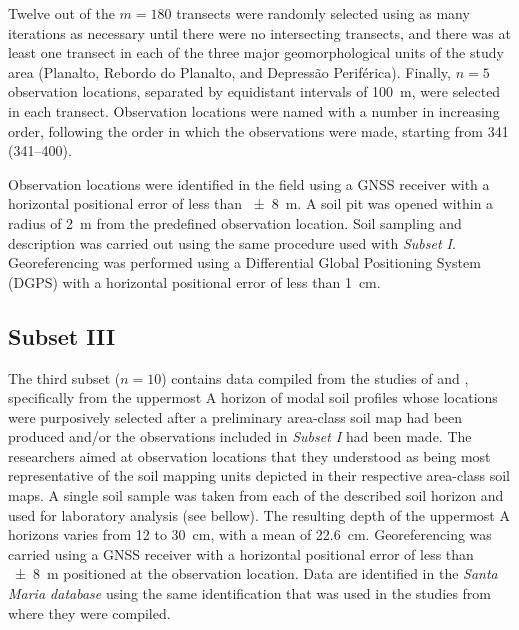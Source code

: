 
Twelve out of the $m = 180$ transects were randomly selected using as many iterations as necessary until 
there were no intersecting transects, and there was at least one transect in each of the three major 
geomorphological units of the study area (Planalto, Rebordo do Planalto, and Depressão Periférica). 
Finally, $n = 5$ observation locations, separated by equidistant intervals of \SI{100}{\metre}, were 
selected in each transect. Observation locations were named with a number in increasing order, 
following the order in which the observations were made, starting from \num{341} (\num{341}--\num{400}).

Observation locations were identified in the field using a GNSS receiver with a horizontal positional error
of less than \SI{\pm8}{\metre}. A soil pit was opened within a radius of \SI{2}{\metre} from the predefined 
observation location. Soil sampling and description was carried out using the same procedure used with 
\emph{Subset I}. Georeferencing was performed using a Differential Global Positioning System (DGPS) with 
a horizontal positional error of less than \SI{1}{\centi\metre}.

\tocless\subsection{Subset III}

The third subset ($n = 10$) contains data compiled from the studies of  and
, specifically from the uppermost A horizon of modal soil profiles whose locations 
were purposively selected after a preliminary area-class soil map had been produced and/or the observations
included in \emph{Subset I} had been made. The researchers aimed at observation locations that they 
understood as being most representative of the soil mapping units depicted in their respective area-class 
soil maps. A single soil sample was taken from each of the described soil horizon and used for laboratory 
analysis (see bellow). The resulting depth of the uppermost A horizons varies from \num{12} to 
\SI{30}{\centi\metre}, with a mean of \SI{22.6}{\centi\metre}. Georeferencing was carried using a GNSS 
receiver with a horizontal positional error of less than \SI{\pm8}{\metre} positioned at the observation 
location. Data are identified in the \emph{Santa Maria database} using the same identification that was 
used in the studies from where they were compiled.

